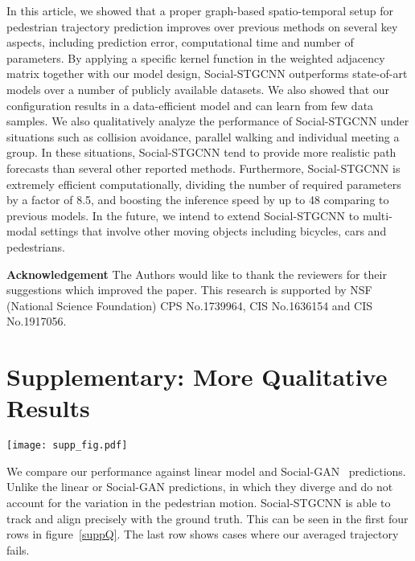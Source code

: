 \documentclass[10pt,twocolumn,letterpaper]{article}
\newcommand*{\ours}{Social-STGCNN }
\begin{document}
In this article, we showed that a proper graph-based spatio-temporal setup for pedestrian trajectory prediction improves over previous methods on several key aspects, including prediction error, computational time and number of parameters. By applying a specific kernel function in the weighted adjacency matrix together with our model design, \ours outperforms state-of-art models over a number of publicly available datasets. We also showed that our configuration results in a data-efficient model and can learn from few data samples. We also qualitatively analyze the performance of \ours under situations such as collision avoidance, parallel walking and individual meeting a group. In these situations, \ours tend to provide more realistic path forecasts than several other reported methods. Furthermore, \ours is extremely efficient computationally, dividing the number of required parameters by a factor of 8.5, and boosting the inference speed by up to 48  comparing to previous models. In the future, we intend to extend \ours to multi-modal settings that involve other moving objects including bicycles, cars and pedestrians. 


\noindent
\textbf{Acknowledgement} The Authors would like to thank the reviewers for their suggestions which improved the paper. This research is supported by NSF (National Science Foundation) CPS No.1739964, CIS No.1636154 and CIS No.1917056. 

{\small


}

\onecolumn
\section*{Supplementary: More Qualitative Results}
\begin{figure*}[ht]
\centering
\texttt{[image: supp\_fig.pdf]}
\caption{Comparison of averaged trajectories predictions per model. Scenes were taken from the ETH dataset~\cite{pellegrini2009you}.}
\label{suppQ}
\end{figure*}

We compare our performance against linear model and Social-GAN~\cite{alahi2016social} predictions. Unlike the linear or Social-GAN predictions, in which they diverge and do not account for the variation in the pedestrian motion. \ours is able to track and align precisely with the ground truth. This can be seen in the first four rows in figure~\ref{suppQ}. The last row shows cases where our averaged trajectory fails.
\end{document}
